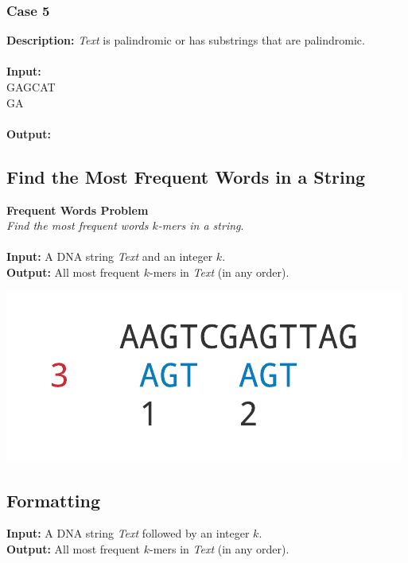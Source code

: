 \documentclass{article}
\newcommand{\code}[1]{{\fontfamily{pcr}\selectfont #1}}
\begin{document}
\subsubsection*{Case 5}
\hline \vspace{5}
\textbf{Description:}  \emph{Text} is palindromic or has substrings that are palindromic.\\ \\
\noindent \textbf{Input:}\\
\code{GAGCAT\\ GA}\\ \\
\noindent \textbf{Output:}\\
\code{1}
\pagebreak

\subsection{Find the Most Frequent Words in a String}
\hline\vspace{5}
\noindent \textbf{Frequent Words Problem}\\
\emph{Find the most frequent words $k$-mers in a string}.\\ \\
\textbf{Input:} A DNA string \emph{Text} and an integer $k$.\\
\textbf{Output:} All most frequent $k$-mers in \emph{Text} (in any order).
\begin{center}
    \includegraphics[scale=0.32]{c1/logos/1B.png} 
\end{center}
\hline\vspace{5}

\subsection*{Formatting}
\textbf{Input:} A DNA string \emph{Text} followed by an integer $k$.\\
\noindent \textbf{Output:} All most frequent $k$-mers in \emph{Text} (in any order).
\end{document}
